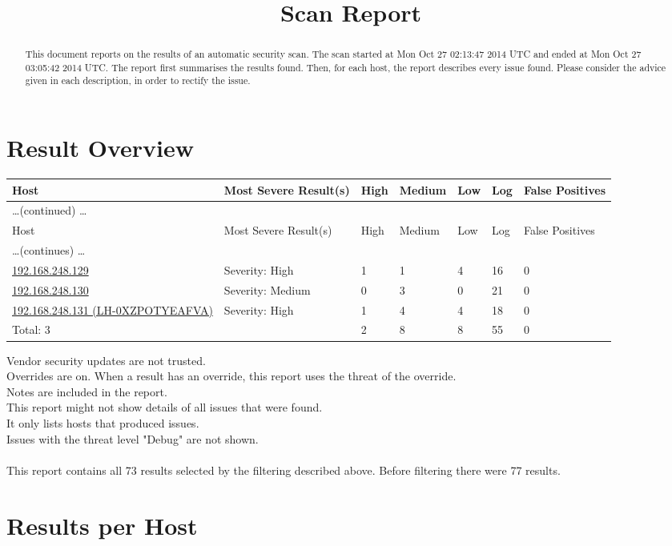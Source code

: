 \documentclass{article}
\title{Scan Report}
\begin{document}
\maketitle

\renewcommand{\abstractname}{Summary}
\begin{abstract}
This document reports on the results of an automatic security scan.
The scan started at Mon Oct 27 02:13:47 2014 UTC and ended at Mon Oct 27 03:05:42 2014 UTC.  The
report first summarises the results found.  Then, for each host,
the report describes every issue found.  Please consider the
advice given in each description, in order to rectify the issue.
\end{abstract}
\tableofcontents
\newpage
\section{Result Overview}

\begin{longtable}{|l|l|l|l|l|l|l|}
\hline
\rowcolor{openvas_report}Host&Most Severe Result(s)&High&Medium&Low&Log&False Positives\\
\hline
\endfirsthead
\multicolumn{6}{l}{\hfill\ldots (continued) \ldots}\\
\hline
\rowcolor{openvas_report}Host&Most Severe Result(s)&High&Medium&Low&Log&False Positives\\
\hline
\endhead
\hline
\multicolumn{6}{l}{\ldots (continues) \ldots}\\
\endfoot
\hline
\endlastfoot
\hline
\hyperref[host:192.168.248.129]{192.168.248.129}&Severity: High&1&1&4&16&0\\
\hline
\hyperref[host:192.168.248.130]{192.168.248.130}&Severity: Medium&0&3&0&21&0\\
\hline
\hyperref[host:192.168.248.131]{192.168.248.131 (LH-0XZPOTYEAFVA)}&Severity: High&1&4&4&18&0\\
\hline
\hline
Total: 3&&2&8&8&55&0\\
\hline
\end{longtable}
Vendor security updates are not trusted.\\
Overrides are on.  When a result has an override, this report uses the threat of the override.\\
Notes are included in the report.\\
This report might not show details of all issues that were found.\\
It only lists hosts that produced issues.\\
Issues with the threat level "Debug" are not shown.\\
\\
This report contains all 73 results selected by the filtering described above.  Before filtering there were 77 results.\section{Results per Host}
\end{document}
